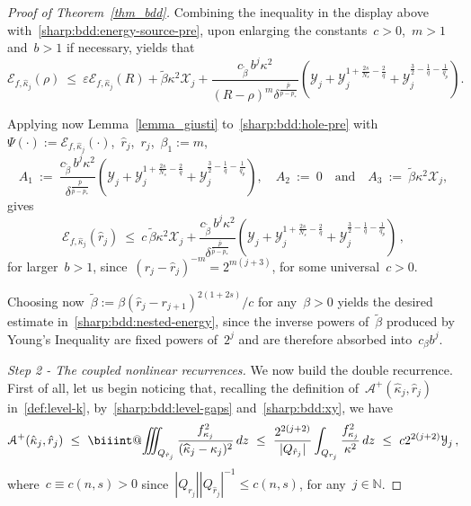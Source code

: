 \documentclass[leqno,10pt]{amsart}
\makeatletter
\theoremstyle{plain}
\theoremstyle{remark}
\numberwithin{equation}{section}
\def\dz{\,{\rm d}z}
\def\en{\mathbb{N}}
\newcommand{\Ac}{\mathcal{A}}
\newcommand{\Ec}{\mathcal{E}}
\newcommand{\kk}{\kappa}
\def\biiint{%
  \mathop{\mathpalette\biiint@{}}\nolimits\!\iiint}
\def\biiint@#1#2{%
  \begingroup
  \setbox0=\hbox{$\m@th#1\iiint$}%
  \dimen@=.81\wd0 %
  \rlap{\hbox to\wd0{%
    \vphantom{\copy0}%
    \hfil$\m@th#1\vcenter{%
      \hrule width\dimen@ height.30pt
    }$\hfil
  }}%
  \endgroup}
\makeatother
\begin{document}
{\begin{proof}[Proof of Theorem~\ref{thm_bdd}]
Combining the inequality in the display above with~\eqref{sharp:bdd:energy-source-pre}, upon enlarging the constants~$c>0$,~$m>1$ and~$b>1$ if necessary, yields that
\begin{equation}\label{sharp:bdd:hole-pre}
\Ec_{f,\hat{\kk}_j}(\rho) \ \leq \ \varepsilon \Ec_{f,\hat{\kk}_j}(R)+\tilde{\beta}\kk^2 \mathcal{X}_j
+\frac{c_{\tilde{\beta}}\,b^j\kk^2}{(R-\rho)^m \delta^\frac{\bar{p}}{\bar{p}-p_\ast}}\left(\mathcal{Y}_j+\mathcal{Y}_j^{1+\frac{2s}{N_s}-\frac{2}{q}} +\mathcal{Y}_j^{\frac{3}{2}-\frac{1}{q}-\frac{1}{q_{p}}}\right).
\end{equation}

Applying now Lemma~\ref{lemma_giusti} to~\eqref{sharp:bdd:hole-pre} with~$\Psi(\cdot):= \Ec_{f,\hat{\kk}_j}(\cdot)$,~$\widehat{r}_j$,~$r_{j}$,~$\beta_1:=m$,
\[
A_1 \ := \ \frac{c_{\tilde{\beta}}\,b^j\kk^2}{\delta^\frac{\bar{p}}{\bar{p}-p_\ast}}\left(\mathcal{Y}_j+\mathcal{Y}_j^{1+\frac{2s}{N_s}-\frac{2}{q}} +\mathcal{Y}_j^{\frac{3}{2}-\frac{1}{q}-\frac{1}{q_{p}}}\right), \quad A_2 \ := \ 0 \quad \text{and} \quad A_3 \ := \ \tilde{\beta}\kk^2\mathcal{X}_j,
\]
gives
\[
\Ec_{f,\hat{\kk}_j}(\widehat{r}_j) \ \leq \ c\,\tilde{\beta}\kk^2 \mathcal{X}_j
+\frac{c_{\tilde{\beta}}\,b^j\kk^2}{\delta^\frac{\bar{p}}{\bar{p}-p_\ast}}\left(\mathcal{Y}_j+\mathcal{Y}_j^{1+\frac{2s}{N_s}-\frac{2}{q}} +\mathcal{Y}_j^{\frac{3}{2}-\frac{1}{q}-\frac{1}{q_{p}}}\right)\,,
\]
for larger~$b>1$, since~$(r_j-\widehat{r}_j)^{-m} = 2^{m(j+3)}$, for some universal~$c>0$.


Choosing now~$\tilde{\beta} := \beta(\widehat{r}_j-r_{j+1})^{2(1+2s)}/c$ for any~$\beta>0$ yields  the desired estimate in~\eqref{sharp:bdd:nested-energy}, since the inverse powers of~$\tilde{\beta}$ produced by Young's Inequality are fixed powers of~$2^j$ and are therefore absorbed into~$c_{\beta}b^j$.


\medskip
{\it Step 2 - The coupled nonlinear recurrences.} We now build the double recurrence. First of all, let us begin noticing that, recalling the definition of~$\Ac^+(\hat{\kk}_j,\hat{r}_j)$ in~\eqref{def:level-k}, by~\eqref{sharp:bdd:level-gaps} and~\eqref{sharp:bdd:xy}, we have
\begin{equation}\label{sharp:bdd:cheb}
\Ac^+(\hat{\kk}_j,\hat{r}_j)  \ \leq \  \biiint_{Q_{\hat{r}_j}}\frac{f_{{\kk}_j}^2}{(\widehat{\kk}_j-\kk_j)^2}\dz
 \ \leq \ \frac{2^{2(j+2)}}{|Q_{\hat{r}_j}|} \int_{Q_{r_j}}\frac{f_{\kk_j}^2}{\kk^2}\dz  \ \leq \ c2^{2(j+2)}\mathcal{Y}_j\,,
\end{equation}
where~$c \equiv c(n,s)>0$ since~$|Q_{r_j}||Q_{\hat{r}_j}|^{-1} \leq c(n,s)$, for any~$j \in \en$.


\end{proof}}
\end{document}
